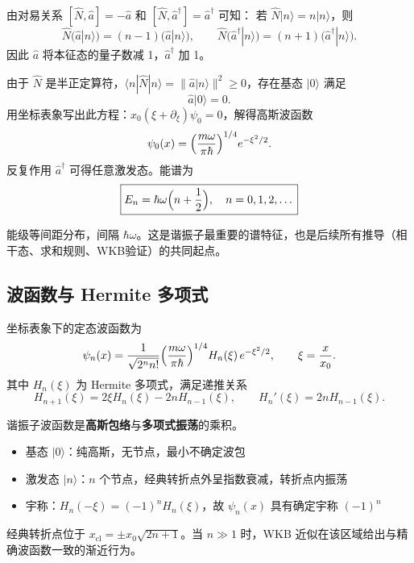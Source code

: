 \begin{derivationbox}[能谱推导]
由对易关系 $[\hat{N}, \hat{a}] = -\hat{a}$ 和 $[\hat{N}, \hat{a}^\dagger] = \hat{a}^\dagger$ 可知：
若 $\hat{N}|n\rangle = n|n\rangle$，则
\[
\hat{N}\bigl(\hat{a}|n\rangle\bigr) = (n-1)\bigl(\hat{a}|n\rangle\bigr),
\qquad
\hat{N}\bigl(\hat{a}^\dagger|n\rangle\bigr) = (n+1)\bigl(\hat{a}^\dagger|n\rangle\bigr).
\]
因此 $\hat{a}$ 将本征态的量子数减 1，$\hat{a}^\dagger$ 加 1。

由于 $\hat{N}$ 是半正定算符，$\langle n|\hat{N}|n\rangle = \|\hat{a}|n\rangle\|^2 \geq 0$，存在基态 $|0\rangle$ 满足
\[
\hat{a}|0\rangle = 0.
\]
用坐标表象写出此方程：$x_0(\xi + \partial_\xi)\psi_0 = 0$，解得高斯波函数
\[
\psi_0(x) = \Bigl(\frac{m\omega}{\pi\hbar}\Bigr)^{1/4} e^{-\xi^2/2}.
\]
反复作用 $\hat{a}^\dagger$ 可得任意激发态。能谱为
\begin{equation}
\boxed{E_n = \hbar\omega\Bigl(n + \frac{1}{2}\Bigr),\quad n = 0,1,2,\dots}
\end{equation}
\end{derivationbox}

能级等间距分布，间隔 $\hbar\omega$。这是谐振子最重要的谱特征，也是后续所有推导（相干态、求和规则、WKB验证）的共同起点。

\subsection{波函数与 Hermite 多项式}

坐标表象下的定态波函数为
\begin{equation}
\psi_n(x) = \frac{1}{\sqrt{2^n n!}}\Bigl(\frac{m\omega}{\pi\hbar}\Bigr)^{1/4}
H_n(\xi)\,e^{-\xi^2/2},
\qquad \xi = \frac{x}{x_0}.
\end{equation}
其中 $H_n(\xi)$ 为 Hermite 多项式，满足递推关系
\[
H_{n+1}(\xi) = 2\xi H_n(\xi) - 2n H_{n-1}(\xi),
\qquad H_n'(\xi) = 2n H_{n-1}(\xi).
\]

\begin{insightbox}[波函数的结构]
谐振子波函数是\textbf{高斯包络}与\textbf{多项式振荡}的乘积。
\begin{itemize}[nosep]
    \item 基态 $|0\rangle$：纯高斯，无节点，最小不确定波包
    \item 激发态 $|n\rangle$：$n$ 个节点，经典转折点外呈指数衰减，转折点内振荡
    \item 宇称：$H_n(-\xi) = (-1)^n H_n(\xi)$，故 $\psi_n(x)$ 具有确定宇称 $(-1)^n$
\end{itemize}
经典转折点位于 $x_\text{cl} = \pm x_0\sqrt{2n+1}$。当 $n\gg 1$ 时，WKB 近似在该区域给出与精确波函数一致的渐近行为。
\end{insightbox}

